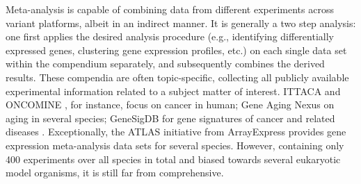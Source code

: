 Meta-analysis is capable of combining data from different experiments across variant platforms, albeit in an indirect manner. It is generally a two step analysis: one first applies the desired analysis procedure (e.g., identifying differentially expressed genes, clustering gene expression profiles, etc.) on each single data set within the compendium separately, and subsequently combines the derived results. These compendia are often topic-specific, collecting all publicly available experimental information related to a subject matter of interest.  ITTACA \cite{Elfilali2006} and ONCOMINE \cite{Rhodes2007}, for instance, focus on cancer in human; Gene Aging Nexus \cite{Pan2007} on aging in several species; GeneSigDB for gene signatures of cancer and related diseases \cite{Culhane2012}. Exceptionally, the ATLAS \cite{Kapushesky2010} initiative from ArrayExpress provides gene expression meta-analysis data sets for several species.  However, containing only 400 experiments over all species in total and biased towards several eukaryotic model organisms, it is still far from comprehensive.



